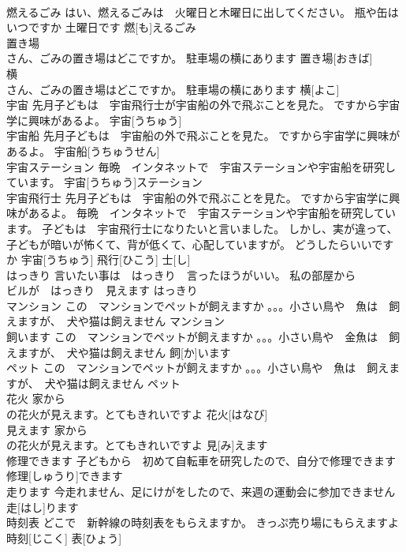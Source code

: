 \documentclass[8pt]{extreport}
\begin{document}
\begin{CJK}{UTF8}{min}
\\	燃えるごみ	はい、燃えるごみは　火曜日と木曜日に出してください。 瓶や缶はいつですか 土曜日です	燃[も]えるごみ					
\\	置き場	
\\	さん、ごみの置き場はどこですか。 駐車場の横にあります	置き場[おきば]					
\\	横	
\\	さん、ごみの置き場はどこですか。 駐車場の横にあります	横[よこ]					
\\	宇宙	先月子どもは　宇宙飛行士が宇宙船の外で飛ぶことを見た。 ですから宇宙学に興味があるよ。	宇宙[うちゅう]					
\\	宇宙船	先月子どもは　宇宙船の外で飛ぶことを見た。 ですから宇宙学に興味があるよ。	宇宙船[うちゅうせん]					
\\	宇宙ステーション	毎晩　インタネットで　宇宙ステーションや宇宙船を研究しています。	宇宙[うちゅう]ステーション					
\\	宇宙飛行士	先月子どもは　宇宙船の外で飛ぶことを見た。 ですから宇宙学に興味があるよ。 毎晩　インタネットで　宇宙ステーションや宇宙船を研究しています。 子どもは　宇宙飛行士になりたいと言いました。 しかし、実が違って、子どもが暗いが怖くて、背が低くて、心配していますが。 どうしたらいいですか	宇宙[うちゅう] 飛行[ひこう] 士[し]					
\\	はっきり	言いたい事は　はっきり　言ったほうがいい。 私の部屋から　
\\	ビルが　はっきり　見えます	はっきり			
\\	マンション	この　マンションでペットが飼えますか 。。。小さい鳥や　魚は　飼えますが、　犬や猫は飼えません	マンション						
\\	飼います	この　マンションでペットが飼えますか 。。。小さい鳥や　金魚は　飼えますが、　犬や猫は飼えません	飼[か]います					
\\	ペット	この　マンションでペットが飼えますか 。。。小さい鳥や　魚は　飼えますが、　犬や猫は飼えません	ペット						
\\	花火	家から　
\\	の花火が見えます。とてもきれいですよ	花火[はなび]					
\\	見えます	家から　
\\	の花火が見えます。とてもきれいですよ	見[み]えます			
\\	修理できます	子どもから　初めて自転車を研究したので、自分で修理できます	修理[しゅうり]できます					
\\	走ります	今走れません、足にけがをしたので、来週の運動会に参加できません	走[はし]ります					
\\	時刻表	どこで　新幹線の時刻表をもらえますか。 きっぷ売り場にもらえますよ	時刻[じこく] 表[ひょう]					

\end{CJK}
\end{document}
